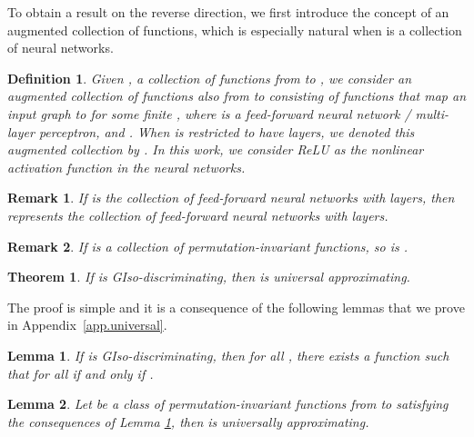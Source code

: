 \documentclass{article}
\newtheorem{theorem}{Theorem}
\newtheorem{lemma}{Lemma}
\newtheorem{definition}{Definition}
\newtheorem{remark}{Remark}
\begin{document}
To obtain a result on the reverse direction, we first introduce the concept of an augmented collection of functions, which is especially natural when  is a collection of neural networks.

\begin{definition}
Given , a collection of functions from  to , we consider an augmented collection of functions also from  to  consisting of functions that map an input graph  to  for some finite , where  is a feed-forward neural network / multi-layer perceptron, and . When  is restricted to have  layers, we denoted this augmented collection by . In this work, we consider ReLU as the nonlinear activation function in the neural networks.
\end{definition}

\begin{remark}
If  is the collection of feed-forward neural networks with  layers, then  represents the collection of feed-forward neural networks with  layers.
\end{remark}

\begin{remark}
If  is a collection of permutation-invariant functions, so is .
\end{remark}

\begin{theorem}
\label{PD2UAfin}
If  is GIso-discriminating, then  is universal approximating.
\end{theorem}

The proof is simple and it is a consequence of the following lemmas that we prove in Appendix~\ref{app.universal}.

\begin{lemma} \label{lemma1}
If  is GIso-discriminating, then for all , there exists a function  such that for all  if and only if .
\end{lemma}

\begin{lemma} \label{lemma2}
Let  be a class of permutation-invariant functions from  to  satisfying the consequences of Lemma \ref{lemma1},
then   is universally approximating.
\end{lemma}
\end{document}
